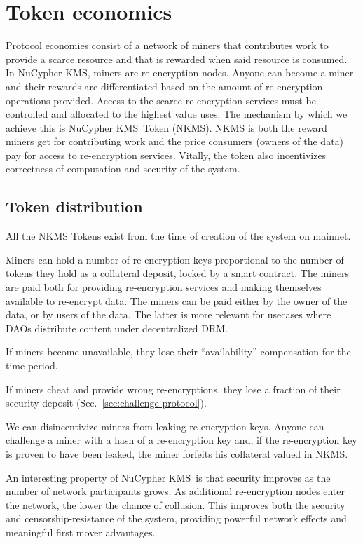 \documentclass[longbibliography,nofootinbib]{revtex4-1}
\newcommand{\kms}{NuCypher KMS}
\begin{document}
\section{Token economics}
\label{sec:token}

Protocol economies consist of a network of miners that contributes work to provide a scarce resource and that is
rewarded when said resource is consumed.
In \kms, miners are re-encryption nodes.
Anyone can become a miner and their rewards are differentiated based on the amount of re-encryption operations provided.
Access to the scarce re-encryption services must be controlled and allocated to the highest value uses.
The mechanism by which we achieve this is \kms~Token (NKMS).
NKMS is both the reward miners get for contributing work and the price consumers (owners of the data) pay for access to re-encryption services.
Vitally, the token also incentivizes correctness of computation and security of the system.

\subsection{Token distribution}

All the NKMS Tokens exist from the time of creation of the system on mainnet.

Miners can hold a number of re-encryption keys proportional to the number of tokens they hold as a collateral deposit, locked by a smart contract.
The miners are paid both for providing re-encryption services and making themselves available to re-encrypt data.
The miners can be paid either by the owner of the data, or by users of the data.
The latter is more relevant for usecases where DAOs distribute content under decentralized DRM.

If miners become unavailable, they lose their ``availability'' compensation for the time period.

If miners cheat and provide wrong re-encryptions, they lose a fraction of their security deposit (Sec.~\ref{sec:challenge-protocol}).

We can disincentivize miners from leaking re-encryption keys.
Anyone can challenge a miner with a hash of a re-encryption key and, if the re-encryption key is proven to have been leaked, the miner forfeits his collateral
valued in NKMS.

An interesting property of \kms~is that security improves as the number of network participants grows. As additional re-encryption
nodes enter the network, the lower the chance of collusion.
This improves both the security and censorship-resistance of the system, providing powerful network effects and meaningful first mover advantages.
\end{document}
